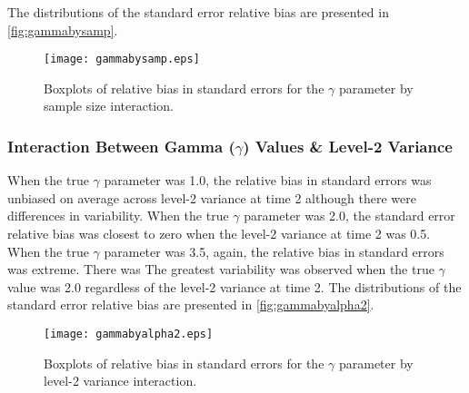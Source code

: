 \documentclass[man, noextraspace, floatsintext, 12pt]{apa7}
\begin{document}
The distributions of the standard error relative bias are presented in \autoref{fig:gammabysamp}.

\begin{figure}[ht]
\centering
\texttt{[image: gammabysamp.eps]}
\caption{Boxplots of relative bias in standard errors for the $\gamma$ parameter by sample size interaction.}\label{fig:gammabysamp}
\end{figure}

\subsubsection*{Interaction Between Gamma ($\gamma$) Values \& Level-2 Variance}
When the true $\gamma$ parameter was 1.0, the relative bias in standard errors was unbiased on average across level-2 variance at time 2 although there were differences in variability. When the true $\gamma$ parameter was 2.0, the standard error relative bias was closest to zero when the level-2 variance at time 2 was 0.5. When the true $\gamma$ parameter was 3.5, again, the relative bias in standard errors was extreme. There was The greatest variability was observed when the true $\gamma$ value was 2.0 regardless of the level-2 variance at time 2. The distributions of the standard error relative bias are presented in \autoref{fig:gammabyalpha2}.

\begin{figure}[ht]
\centering
\texttt{[image: gammabyalpha2.eps]}
\caption{Boxplots of relative bias in standard errors for the $\gamma$ parameter by level-2 variance interaction.}\label{fig:gammabyalpha2}
\end{figure}
\end{document}
